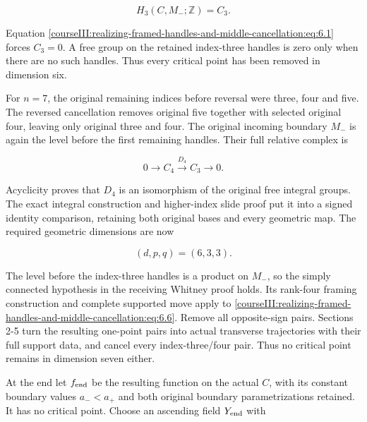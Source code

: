 \begin{equation}
H_3(C,M_-;\mathbb Z)=C_3.
 \label{courseIII:realizing-framed-handles-and-middle-cancellation:eq:6.4}
\end{equation}

Equation \eqref{courseIII:realizing-framed-handles-and-middle-cancellation:eq:6.1} forces \(C_3=0\). A free group on the retained index-three handles is zero only when there are no such handles. Thus every critical point has been removed in dimension six.

For \(n=7\), the original remaining indices before reversal were three, four and five. The reversed cancellation removes original five together with selected original four, leaving only original three and four. The original incoming boundary \(M_-\) is again the level before the first remaining handles. Their full relative complex is

\begin{equation}
0\longrightarrow C_4\xrightarrow{D_4}C_3\longrightarrow0.
 \label{courseIII:realizing-framed-handles-and-middle-cancellation:eq:6.5}
\end{equation}

Acyclicity proves that \(D_4\) is an isomorphism of the original free integral groups. The exact integral construction and higher-index slide proof put it into a signed identity comparison, retaining both original bases and every geometric map. The required geometric dimensions are now

\begin{equation}
(d,p,q)=(6,3,3).
 \label{courseIII:realizing-framed-handles-and-middle-cancellation:eq:6.6}
\end{equation}

The level before the index-three handles is a product on \(M_-\), so the simply connected hypothesis in the receiving Whitney proof holds. Its rank-four framing construction and complete supported move apply to \eqref{courseIII:realizing-framed-handles-and-middle-cancellation:eq:6.6}. Remove all opposite-sign pairs. Sections 2-5 turn the resulting one-point pairs into actual transverse trajectories with their full support data, and cancel every index-three/four pair. Thus no critical point remains in dimension seven either.

At the end let \(f_{\rm end}\) be the resulting function on the actual \(C\), with its constant boundary values \(a_-<a_+\) and both original boundary parametrizations retained. It has no critical point. Choose an ascending field \(Y_{\rm end}\) with

